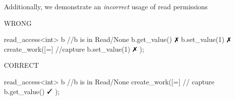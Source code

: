 Additionally, we demonstrate an \emph{incorrect} usage of read permissions

\begin{minipage}[t]{0.45\linewidth}
\centering
\centering WRONG
\begin{vaspPseudo}
read_access<int> b
//b is in Read/None
b.get_value()   $\no$
b.set_value(1)  $\no$
create_work([=]{ //capture
  b.set_value(1) $\no$
});
\end{vaspPseudo}
\end{minipage}
\begin{minipage}[t]{0.45\linewidth}
\centering
\centering CORRECT
\begin{vaspPseudo}
read_access<int> b
//b is in Read/None
create_work([=]{ // capture
  b.get_value()  $\yes$
});
\end{vaspPseudo}
\end{minipage}



